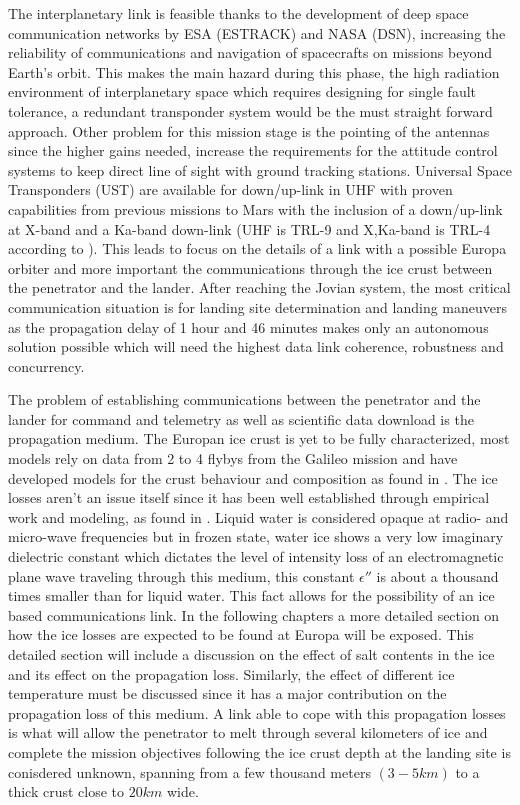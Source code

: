The interplanetary link is feasible thanks to the development of deep space communication networks by ESA (ESTRACK) and NASA (DSN), increasing the reliability of communications and navigation of spacecrafts on missions beyond Earth's orbit. This makes the main hazard during this phase, the high radiation environment of interplanetary space which requires designing for single fault tolerance, a redundant transponder system would be the must straight forward approach. Other problem for this mission stage is the pointing of the antennas since the higher gains needed, increase the requirements for the attitude control systems to keep direct line of sight with ground tracking stations. Universal Space Transponders (UST) are available for down/up-link in UHF with proven capabilities from previous missions to Mars with the inclusion of a down/up-link at X-band and a Ka-band down-link (UHF is TRL-9 and X,Ka-band is TRL-4 according to \cite{clipper}). This leads to focus on the details of a link with a possible Europa orbiter and more important the communications through the ice crust between the penetrator and the lander. After reaching the Jovian system, the most critical communication situation is for landing site determination and landing maneuvers as the propagation delay of 1 hour and 46 minutes makes only an autonomous solution possible which will need the highest data link coherence, robustness and concurrency.

The problem of establishing communications between the penetrator and the lander for command and telemetry as well as scientific data download is the propagation medium. The Europan ice crust is yet to be fully characterized, most models rely on data from 2 to 4 flybys from the Galileo mission and have developed models for the crust behaviour and composition as found in \cite{Chyba}. The ice losses aren't an issue itself since it has been well established through empirical work and modeling, as found in \cite{iceLink-scott}. Liquid water is considered opaque at radio- and micro-wave frequencies but in frozen state, water ice shows a very low imaginary dielectric constant which dictates the level of intensity loss of an electromagnetic plane wave traveling through this medium, this constant $\epsilon''$ is about a thousand times smaller than for liquid water. This fact allows for the possibility of an ice based communications link. In the following chapters a more detailed section on how the ice losses are expected to be found at Europa will be exposed. This detailed section will include a discussion on the effect of salt contents in the ice and its effect on the propagation loss. Similarly, the effect of different ice temperature must be discussed since it has a major contribution on the propagation loss of this medium. A link able to cope with this propagation losses is what will allow the penetrator to melt through several kilometers of ice and complete the mission objectives following the ice crust depth at the landing site is conisdered unknown, spanning from a few thousand meters $(3-5 km)$ to a thick crust close to $20 km$ wide.

